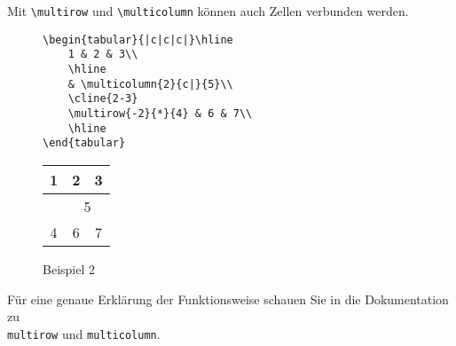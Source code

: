 Mit \verb|\multirow| und \verb|\multicolumn| können auch Zellen verbunden werden.
\begin{figure}[h] 
	\begin{minipage}[t]{0.47\textwidth} 
\begin{lstlisting}[style=latex]
\begin{tabular}{|c|c|c|}\hline
	1 & 2 & 3\\
	\hline
	& \multicolumn{2}{c|}{5}\\
	\cline{2-3}
	\multirow{-2}{*}{4} & 6 & 7\\
	\hline
\end{tabular}
\end{lstlisting}
	\end{minipage} 
	\begin{minipage}[t]{0.47\textwidth} 
		\centering
		\caption*{Beispiel 2}
		\begin{tabular}{|c|c|c|}\hline
			1 & 2 & 3\\\hline
			& \multicolumn{2}{c|}{5}\\\cline{2-3}
			\multirow{-2}{*}{4} & 6 & 7\\\hline
		\end{tabular}
	\end{minipage} 
\end{figure} 

Für eine genaue Erklärung der Funktionsweise schauen Sie in die Dokumentation zu\\\verb|multirow| und \verb|multicolumn|.

